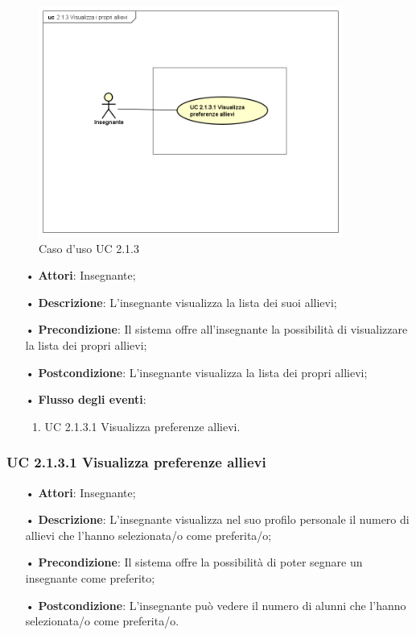 \begin{figure}[H]
\centering
\includegraphics[width=10cm]{img/UC213.png} 
\caption{Caso d'uso UC 2.1.3}
\end{figure}

\begin{itemize}
	\item[•] \textbf{Attori}: Insegnante;
	\item[•] \textbf{Descrizione}: L’insegnante visualizza la lista dei suoi allievi;
	\item[•] \textbf{Precondizione}: Il sistema offre all’insegnante la possibilità di visualizzare la lista dei propri allievi;
	\item[•] \textbf{Postcondizione}: L’insegnante visualizza la lista dei propri allievi;
	\item[•] \textbf{Flusso degli eventi}:
		\begin{enumerate}
			\item UC 2.1.3.1 Visualizza preferenze allievi.
		\end{enumerate}
\end{itemize}
\subsubsection{UC 2.1.3.1 Visualizza preferenze allievi}
\begin{itemize}
	\item[•] \textbf{Attori}: Insegnante;
	\item[•] \textbf{Descrizione}: L’insegnante visualizza nel suo profilo personale il numero di allievi che l'hanno selezionata/o come preferita/o;
	\item[•] \textbf{Precondizione}: Il sistema offre la possibilità di poter segnare un insegnante come preferito;
	\item[•] \textbf{Postcondizione}: L’insegnante può vedere il numero di alunni che l'hanno selezionata/o come preferita/o.
\end{itemize}

